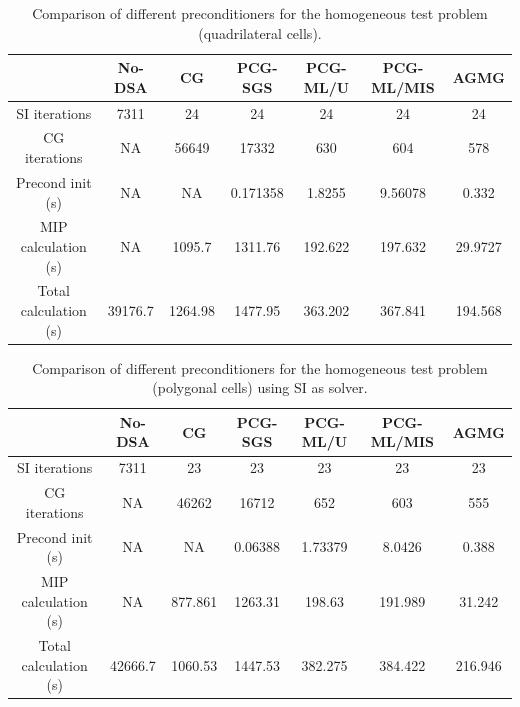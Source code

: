 \documentclass[preprint,10pt]{elsarticle}
\renewcommand{\(}{\left(}
\renewcommand{\)}{\right)}
\renewcommand{\[}{\left[}
\renewcommand{\]}{\right]}
\begin{document}
%
\begin{table}[!htbp]
  \begin{center}
    \caption{Comparison of different preconditioners for the homogeneous test problem (quadrilateral cells).}
    \begin{tabular}{|c|c|c|c|c|c|c|}
      \hline
      & No-DSA & CG & PCG-SGS & PCG-ML/U & PCG-ML/MIS & AGMG \\
      \hline
      SI iterations   & 7311    & 24      & 24       & 24      & 24      & 24 \\
      CG iterations   & NA      & 56649   & 17332    & 630     & 604     & 578 \\
\hline
    Precond init (s)   & NA      & NA      & 0.171358 & 1.8255  & 9.56078 & 0.332 \\
 MIP calculation (s)   & NA      & 1095.7  & 1311.76  & 192.622 & 197.632 & 29.9727 \\
 Total calculation (s) & 39176.7 & 1264.98 & 1477.95  & 363.202 & 367.841 &  194.568 \\
      \hline
    \end{tabular}
    \label{comparison_homog_quad}
  \end{center}
\end{table}
%
\begin{table}[!htbp]
  \begin{center}
    \caption{Comparison of different preconditioners for the homogeneous test
    problem (polygonal cells) using SI as solver.}
    \begin{tabular}{|c|c|c|c|c|c|c|}
      \hline
      & No-DSA & CG & PCG-SGS & PCG-ML/U & PCG-ML/MIS & AGMG \\
      \hline
      SI iterations   & 7311    & 23      & 23      & 23      & 23      & 23 \\
      CG iterations   & NA      & 46262   & 16712   & 652     & 603     & 555 \\
\hline
   Precond init (s)   & NA      & NA      & 0.06388 & 1.73379 & 8.0426  & 0.388 \\
MIP calculation (s)   & NA      & 877.861 & 1263.31 & 198.63  & 191.989 & 31.242 \\
Total calculation (s) & 42666.7 & 1060.53 & 1447.53 & 382.275 & 384.422 & 216.946 \\
      \hline
    \end{tabular}
    \label{comparison_homog_poly_si}
  \end{center}
\end{table}
%
\end{document}
